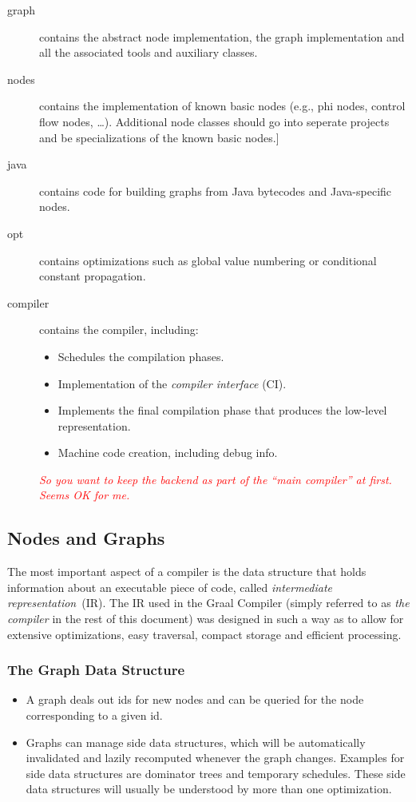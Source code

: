 \documentclass[twocolumn]{svjour3}
\newcommand{\mynote}[2]{
\textcolor{red}{\fbox{\bfseries\sffamily\scriptsize#1}
  {\small\textsf{\emph{#2}}}
\fbox{\bfseries\sffamily\scriptsize }}}
\newcommand\cw[1]{\mynote{CW}{#1}}
\begin{document}
\begin{description}
    \item[graph] contains the abstract node implementation, the graph implementation and all the associated tools and auxiliary classes.
    \item[nodes] contains the implementation of known basic nodes (e.g., phi nodes, control flow nodes, \ldots).
 				 Additional node classes should go into seperate projects and be specializations of the known basic nodes.]
    \item[java] contains code for building graphs from Java bytecodes and Java-specific nodes.
    \item[opt] contains optimizations such as global value numbering or conditional constant propagation.
    \item[compiler] contains the compiler, including:
        \begin{itemize}
            \item Schedules the compilation phases.
            \item Implementation of the \emph{compiler interface} (CI).
            \item Implements the final compilation phase that produces the low-level representation.
            \item Machine code creation, including debug info.
        \end{itemize}
		\cw{So you want to keep the backend as part of the ``main compiler'' at first.  Seems OK for me.}
\end{description}

\subsection{Nodes and Graphs}
The most important aspect of a compiler is the data structure that holds information about an executable piece of code, called \emph{intermediate representation}~(IR).
The IR used in the Graal Compiler (simply referred to as \emph{the compiler} in the rest of this document) was designed in such a way as to allow for extensive optimizations, easy traversal, compact storage and efficient processing.

\subsubsection{The Graph Data Structure}
\begin{itemize}
    \item A graph deals out ids for new nodes and can be queried for the node corresponding to a given id.
    \item Graphs can manage side data structures, which will be automatically invalidated and lazily recomputed whenever the graph changes. Examples for side data structures are dominator trees and temporary schedules. These side data structures will usually be understood by more than one optimization.
\end{itemize}
\end{document}
